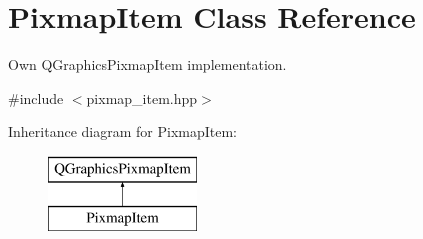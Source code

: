 \hypertarget{classPixmapItem}{}\section{Pixmap\+Item Class Reference}
\label{classPixmapItem}


Own Q\+Graphics\+Pixmap\+Item implementation.  




{\ttfamily \#include $<$pixmap\+\_\+item.\+hpp$>$}

Inheritance diagram for Pixmap\+Item\+:\begin{figure}[H]
\begin{center}
\leavevmode
\includegraphics[height=2.000000cm]{classPixmapItem}
\end{center}
\end{figure}
